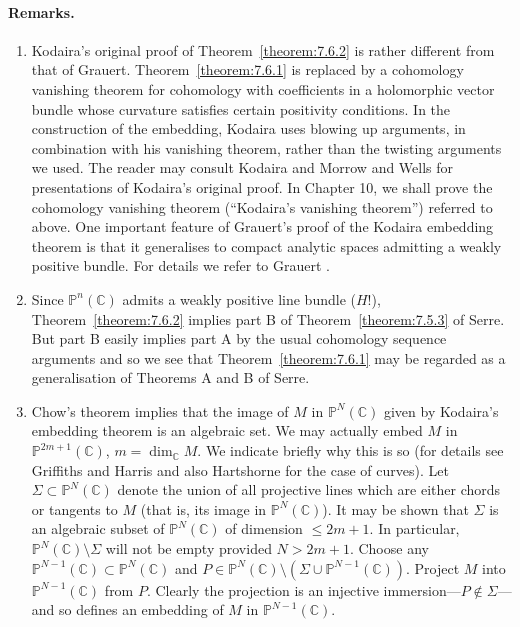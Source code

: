 \paragraph{Remarks.}
\begin{enumerate}
\item Kodaira's original proof of Theorem~\ref{theorem:7.6.2} is rather different from that of Grauert. Theorem~\ref{theorem:7.6.1} is replaced by a cohomology vanishing theorem for cohomology with coefficients in a holomorphic vector bundle whose curvature satisfies certain positivity conditions. In the construction of the embedding, Kodaira uses blowing up arguments, in combination with his vanishing theorem, rather than the twisting arguments we used. The reader may consult Kodaira and Morrow \cite{bib:II:kodaira-k-and-morrow-j:1} and Wells \cite{bib:II:wells-r-o:1} for presentations of Kodaira's original proof. In Chapter 10, we shall prove the cohomology vanishing theorem (``Kodaira's vanishing theorem'') referred to above. One important feature of Grauert's proof of the Kodaira embedding theorem is that it generalises to compact analytic spaces admitting a weakly positive bundle. For details we refer to Grauert \cite{bib:II:grauert-h:1}.
\item Since $\mathbb{P}^n(\mathbb{C})$ admits a weakly positive line bundle ($H!$), Theorem~\ref{theorem:7.6.2} implies part B of Theorem~\ref{theorem:7.5.3} of Serre. But part B easily implies part A by the usual cohomology sequence arguments and so we see that Theorem~\ref{theorem:7.6.1} may be regarded as a generalisation of Theorems A and B of Serre.
\item Chow's theorem implies that the image of $M$ in $\mathbb{P}^N(\mathbb{C})$ given by Kodaira's embedding theorem is an algebraic set. We may actually embed $M$ in $\mathbb{P}^{2m+1}(\mathbb{C})$, $m=\dim_{\mathbb{C}}M$. We indicate briefly why this is so (for details see Griffiths and Harris \cite{bib:II:griffiths-p-and-harris-j:1} and also Hartshorne \cite{bib:II:hartshorne-r:1} for the case of curves). Let $\Sigma\subset\mathbb{P}^N(\mathbb{C})$ denote the union of all projective lines which are either chords or tangents to $M$ (that is, its image in $\mathbb{P}^N(\mathbb{C})$). It may be shown that $\Sigma$ is an algebraic subset of $\mathbb{P}^N(\mathbb{C})$ of dimension $\leq2m+1$. In particular, $\mathbb{P}^N(\mathbb{C})\setminus\Sigma$ will not be empty provided $N>2m+1$. Choose any $\mathbb{P}^{N-1}(\mathbb{C})\subset\mathbb{P}^N(\mathbb{C})$ and
$P\in\mathbb{P}^N(\mathbb{C})\setminus(\Sigma\cup\mathbb{P}^{N-1}(\mathbb{C}))$. Project $M$ into $\mathbb{P}^{N-1}(\mathbb{C})$ from $P$. Clearly the projection is an injective immersion---$P\notin\Sigma$---and so defines an embedding of $M$ in $\mathbb{P}^{N-1}(\mathbb{C})$.
\end{enumerate}

